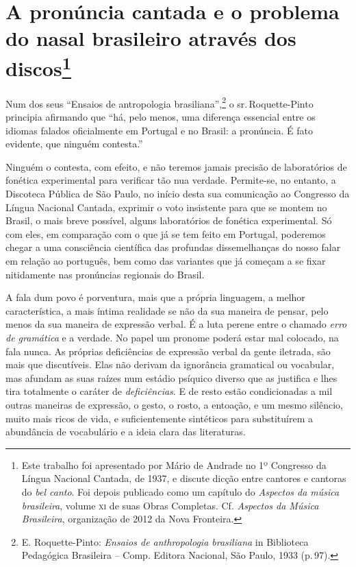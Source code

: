 \chapter{A pronúncia cantada e o problema do nasal brasileiro através dos discos\footnote{Este trabalho foi apresentado por Mário de Andrade no 1º Congresso da Língua Nacional Cantada, de 1937, e discute dicção entre cantores e cantoras do \textit{bel canto}. Foi depois publicado como um capítulo do \textit{Aspectos da música brasileira}, volume \textsc{xi} de suas Obras Completas. Cf. \textit{Aspectos da Música Brasileira}, organização de 2012 da Nova Fronteira.}}

Num dos seus ``Ensaios de antropologia brasiliana'',\footnote{E. Roquette-Pinto: \textit{Ensaios de anthropologia brasiliana} in Biblioteca Pedagógica Brasileira -- Comp. Editora Nacional, São Paulo, 1933 (p.\,97).} o sr.\,Roquette-Pinto
principia afirmando que ``há, pelo menos, uma diferença essencial entre
os idiomas falados oficialmente em Portugal e no Brasil: a pronúncia. É
fato evidente, que ninguém contesta.''

Ninguém o contesta, com efeito, e não teremos jamais precisão de
laboratórios de fonética experimental para verificar tão nua verdade.
Permite-se, no entanto, a Discoteca Pública de São Paulo, no início
desta sua comunicação ao Congresso da Língua Nacional Cantada, exprimir
o voto insistente para que se montem no Brasil, o mais breve possível,
alguns laboratórios de fonética experimental. Só com eles, em comparação
com o que já se tem feito em Portugal, poderemos chegar a uma
consciência científica das profundas dissemelhanças do nosso falar em
relação ao português, bem como das variantes que já começam a se fixar
nitidamente nas pronúncias regionais do Brasil.

A fala dum povo é porventura, mais que a própria linguagem, a melhor
característica, a mais íntima realidade se não da sua maneira de pensar,
pelo menos da sua maneira de expressão verbal. É a luta perene entre o
chamado \textit{erro de gramática} e a verdade. No papel um pronome poderá
estar mal colocado, na fala nunca. As próprias deficiências de expressão
verbal da gente iletrada, são mais que discutíveis. Elas não derivam da
ignorância gramatical ou vocabular, mas afundam as suas raízes num
estádio psíquico diverso que as justifica e lhes tira totalmente o
caráter de \textit{deficiências}. E de resto estão condicionadas a mil outras
maneiras de expressão, o gesto, o rosto, a entoação, e um mesmo
silêncio, muito mais ricos de vida, e suficientemente sintéticos para
substituírem a abundância de vocabulário e a ideia clara das
literaturas.

